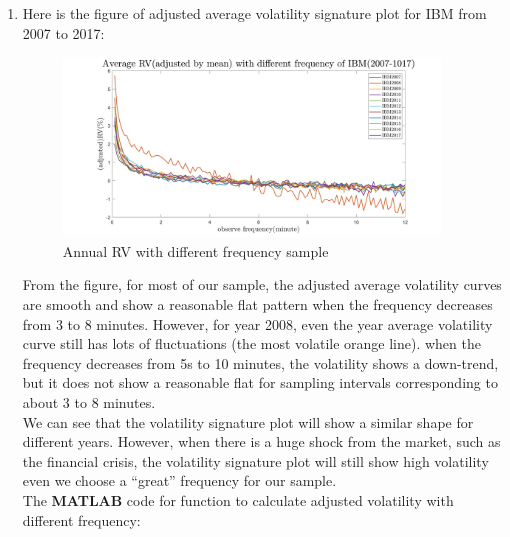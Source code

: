 \documentclass[12pt,letterpaper]{article}
\begin{document}
\begin{enumerate}[label=\textbf{(\Alph*)}]
\item Here is the figure of adjusted average volatility signature plot for IBM from 2007 to 2017:
\begin{figure}[H]
            \centering
            \includegraphics[width=10cm]{figures/p2_ex3_f_IBM(2007-2017).jpg}
            \caption{Annual RV with different frequency sample}
            \label{fig:9}
        \end{figure}

From the figure, for most of our sample, the adjusted average volatility curves are smooth and show a reasonable flat pattern when the frequency decreases from 3 to 8 minutes. However, for year 2008, even the year average volatility curve still has lots of fluctuations (the most volatile orange line). when the frequency decreases from 5s to 10 minutes, the volatility shows a down-trend, but it does not show a reasonable flat for sampling intervals corresponding to about 3 to 8 minutes. \\

We can see that the volatility signature plot will show a similar shape for different years. However, when there is a huge shock from the market, such as the financial crisis, the volatility signature plot will still show high volatility even we choose a ``great'' frequency for our sample.\\


The \textbf{MATLAB} code for function to calculate adjusted volatility with different frequency:
   
   
  ~~\\


\end{enumerate}
\end{document}
